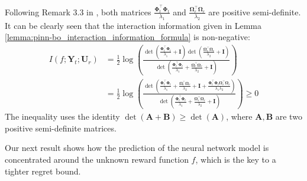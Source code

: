 \begin{remark}
    \label{remark:pinn-bo_non_negative_interaction_information}
    Following Remark 3.3 in \citet{wang2022and}, both matrices $\frac{\boldsymbol{\Phi}_t^\top \boldsymbol{\Phi}_t}{\lambda_1}$ and $\frac{\boldsymbol{\Omega}_r^\top \boldsymbol{\Omega}_r}{\lambda_2}$ are positive semi-definite. It can be clearly seen that the interaction information given in Lemma \ref{lemma:pinn-bo_interaction_information_formula} is non-negative:
    \begin{equation*}
    \begin{aligned}
            I (f; \mathbf{Y}_t; \mathbf{U}_r) &= \frac{1}{2}  \log (\frac{\det(\frac{\boldsymbol{\Phi}_t^\top \boldsymbol{\Phi}_t}{\lambda_1} + \mathbf{I})\det(\frac{\boldsymbol{\Omega}_r^\top \boldsymbol{\Omega}_r}{\lambda_2} + \mathbf{I})}{\det(\frac{\boldsymbol{\Phi}_t^\top \boldsymbol{\Phi}_t}{\lambda_1} + \frac{\boldsymbol{\Omega}_r^\top \boldsymbol{\Omega}_r}{\lambda_2} + \mathbf{I})}) \\
            &= \frac{1}{2}  \log (\frac{\det(\frac{\boldsymbol{\Phi}_t^\top \boldsymbol{\Phi}_t}{\lambda_1} + \frac{\boldsymbol{\Omega}_r^\top \boldsymbol{\Omega}_r}{\lambda_2}  + \mathbf{I} + \frac{\boldsymbol{\Phi}_t^\top \boldsymbol{\Phi}_t \boldsymbol{\Omega}_r^\top \boldsymbol{\Omega}_r}{\lambda_1 \lambda_2})}{\det(\frac{\boldsymbol{\Phi}_t^\top \boldsymbol{\Phi}_t}{\lambda_1} + \frac{\boldsymbol{\Omega}_r^\top \boldsymbol{\Omega}_r}{\lambda_2} + \mathbf{I})}) \ge 0
        \end{aligned}
    \end{equation*}
    The inequality uses the identity $\det(\mathbf{A}+ \mathbf{B}) \ge \det(\mathbf{A})$, where $\mathbf{A},\mathbf{B}$ are two positive semi-definite matrices. 
\end{remark}
Our next result shows how the prediction of the neural network model is concentrated around the unknown reward function $f$, which is the key to a tighter regret bound.


